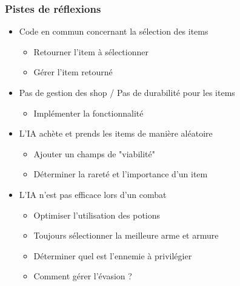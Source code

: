 \documentclass[beamer]{BetterDocument}
\begin{document}
	\begin{frame}
		\frametitle{Pistes de réflexions}

		\begin{itemize}
			\item{Code en commun concernant la sélection des items}
			\begin{itemize}
				\item{Retourner l'item à sélectionner}
				\item{Gérer l'item retourné}
			\end{itemize}

			\item{Pas de gestion des shop / Pas de durabilité pour les items}
			\begin{itemize}
				\item{Implémenter la fonctionnalité}
			\end{itemize}

			\item{L'IA achète et prends les items de manière aléatoire}
			\begin{itemize}
				\item{Ajouter un champs de "viabilité"}
				\item{Déterminer la rareté et l'importance d'un item}
			\end{itemize}

			\item{L'IA n'est pas efficace lors d'un combat}
			\begin{itemize}
				\item{Optimiser l'utilisation des potions}
				\item{Toujours sélectionner la meilleure arme et armure}
				\item{Déterminer quel est l'ennemie à privilégier}
				\item{Comment gérer l'évasion ?}
			\end{itemize}
		\end{itemize}
	\end{frame}
\end{document}
